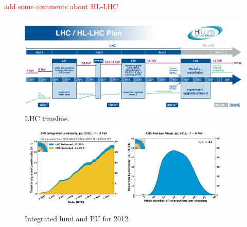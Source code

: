 \textcolor{red}{add some comments about HL-LHC}

\begin{figure}[h]
 \begin{center}
  \includegraphics[width=\textwidth]{chapters/Chapter2-CMSatLHC/Figures/HL-LHC-plan-2016-01.png}
 \end{center}
 \caption{LHC timeline.}
 \label{fig:LHCschedule}
\end{figure}

\begin{figure}[h]
 \begin{center}
  \includegraphics[width=0.45\textwidth]{chapters/Chapter2-CMSatLHC/Figures/int_lumi_per_day_cumulative_pp_2012.png}
   \includegraphics[width=0.45\textwidth]{chapters/Chapter2-CMSatLHC/Figures/pileup_pp_2012.png}
 \end{center}
 \caption{Integrated lumi and PU for 2012.}
 \label{fig:LHCRun1}
\end{figure}

